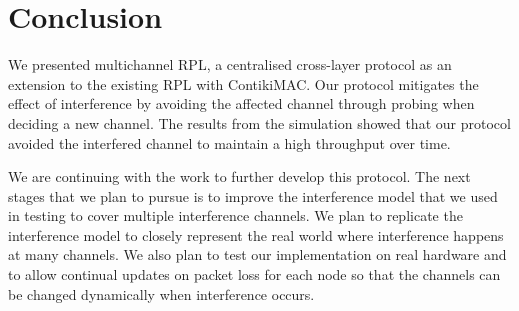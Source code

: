 \section{Conclusion}
\label{sec:conclusion}


We presented multichannel RPL, a centralised cross-layer protocol as an extension to the existing RPL with ContikiMAC. Our protocol mitigates the effect of interference by avoiding the affected channel through probing when deciding a new channel. The results from the simulation showed that our protocol avoided the interfered channel to maintain a high throughput over time. 

We are continuing with the work to further develop this protocol. The next stages that we plan to pursue is to improve the interference model that we used in testing to cover multiple interference channels. We plan to replicate the interference model to closely represent the real world where interference happens at many channels. We also plan to test our implementation on real hardware and to allow continual updates on packet loss for each node so that the channels can be changed dynamically when interference occurs.



